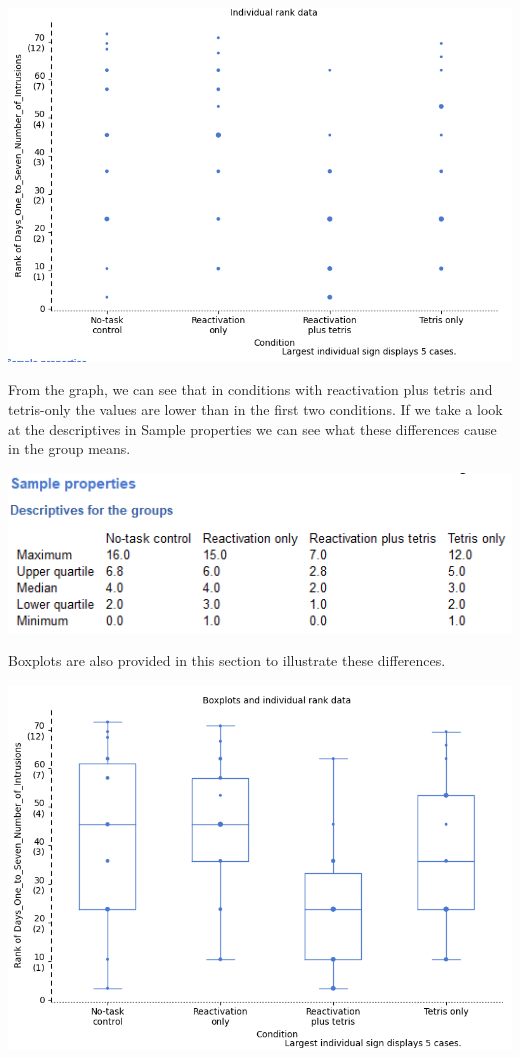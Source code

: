 \documentclass[
]{book}
\begin{document}
\includegraphics{img/ch8/8.3comparegroups_rawplot.png}

From the graph, we can see that in conditions with reactivation plus tetris and tetris-only the values are lower than in the first two conditions. If we take a look at the descriptives in Sample properties we can see what these differences cause in the group means.

\includegraphics{img/ch8/8.3comparegroups_sampleprop.png}

Boxplots are also provided in this section to illustrate these differences.

\includegraphics{img/ch8/8.3comparegroups_boxplot.png}
\end{document}
